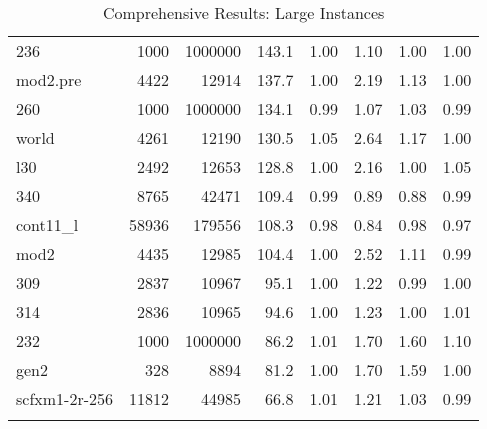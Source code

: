 \documentclass[10pt]{article}
\begin{document}
\begin{longtable}{|l|r|r|r|r|r|r|r|}
236	&	1000	&	1000000	&	143.1	&	1.00	&	1.10	&	1.00	&	1.00	\\
mod2.pre	&	4422	&	12914	&	137.7	&	1.00	&	2.19	&	1.13	&	1.00	\\
260	&	1000	&	1000000	&	134.1	&	0.99	&	1.07	&	1.03	&	0.99	\\
world	&	4261	&	12190	&	130.5	&	1.05	&	2.64	&	1.17	&	1.00	\\
l30	&	2492	&	12653	&	128.8	&	1.00	&	2.16	&	1.00	&	1.05	\\
340	&	8765	&	42471	&	109.4	&	0.99	&	0.89	&	0.88	&	0.99	\\
cont11\_l	&	58936	&	179556	&	108.3	&	0.98	&	0.84	&	0.98	&	0.97	\\
mod2	&	4435	&	12985	&	104.4	&	1.00	&	2.52	&	1.11	&	0.99	\\
309	&	2837	&	10967	&	95.1	&	1.00	&	1.22	&	0.99	&	1.00	\\
314	&	2836	&	10965	&	94.6	&	1.00	&	1.23	&	1.00	&	1.01	\\
232	&	1000	&	1000000	&	86.2	&	1.01	&	1.70	&	1.60	&	1.10	\\
gen2	&	328	&	8894	&	81.2	&	1.00	&	1.70	&	1.59	&	1.00	\\
scfxm1-2r-256	&	11812	&	44985	&	66.8	&	1.01	&	1.21	&	1.03	&	0.99	\\
\hline
\caption{Comprehensive Results: Large Instances}
\small
\centering
\label{supptab:all_large}
\end{longtable}
\end{document}
